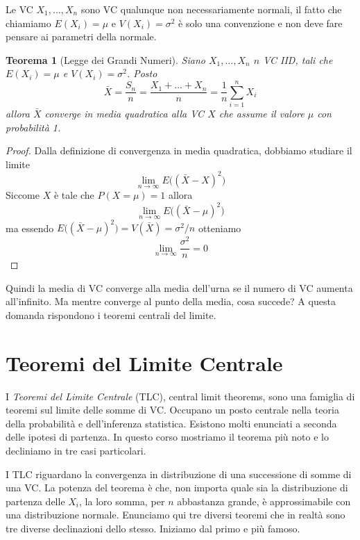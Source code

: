 \documentclass[
  11pt,
]{book}
\theoremstyle{mytheoremstyle}
\newtheorem{theorem}{Teorema}[section]
\theoremstyle{mydefstyle}
\newenvironment{att}
  {
\begin{tcolorbox}[enhanced,arc=0.1mm,boxrule=1pt,colback=white,colframe=ared,title=\bf\small \fontfamily{lmss}\selectfont \faExclamationTriangle \hspace{.5 cm} Attenzione,drop fuzzy shadow]
}{
\end{tcolorbox}
  }
\begin{document}
\begin{att}
Le VC \(X_1,...,X_n\) sono VC qualunque non necessariamente normali, il
fatto che chiamiamo \(E(X_i)=\mu\) e \(V(X_i)=\sigma^2\) è solo una
convenzione e non deve fare pensare ai parametri della normale.

\end{att}

\begin{theorem}[Legge dei Grandi Numeri]
Siano \(X_1,...,X_n\) \(n\) VC IID, tali che \(E(X_i)=\mu\) e
\(V(X_i)=\sigma^2\). Posto
\[\bar X= \frac{S_n}n =\frac{X_1+...+X_n}n=\frac 1n\sum_{i=1}^nX_i\]
allora \(\bar X\) converge in media quadratica alla VC \(X\) che assume il
valore \(\mu\) con probabilità 1.
\end{theorem}

\begin{proof}
Dalla definizione di convergenza in media quadratica, dobbiamo studiare
il limite \[\lim_{n\to\infty}E\big((\bar X-X)^2\big)\] Siccome \(X\) è
tale che \(P(X=\mu)=1\) allora
\[\lim_{n\to\infty}E\big((\bar X-\mu)^2\big)\] ma essendo
\(E\big((\bar X-\mu)^2\big)=V(\bar X)=\sigma^2/n\) otteniamo
\[\lim_{n\to\infty}\frac {\sigma^2}n=0\]
\end{proof}

Quindi la media di VC converge alla media dell'urna se il numero di VC
aumenta all'infinito. Ma mentre converge al punto della media, cosa
succede? A questa domanda rispondono i teoremi centrali del limite.

\section{Teoremi del Limite Centrale}\label{teoremi-del-limite-centrale}

I \emph{Teoremi del Limite Centrale} (TLC), central limit theorems, sono una
famiglia di teoremi sul limite delle somme di VC. Occupano un posto
centrale nella teoria della probabilità e dell'inferenza statistica.
Esistono molti enunciati a seconda delle ipotesi di partenza. In questo
corso mostriamo il teorema più noto e lo decliniamo in tre casi
particolari.

I TLC riguardano la convergenza in distribuzione di una successione di
somme di una VC. La potenza del teorema è che, non importa quale sia la
distribuzione di partenza delle \(X_i\), la loro somma, per \(n\) abbastanza
grande, è approssimabile con una distribuzione normale. Enunciamo qui
tre diversi teoremi che in realtà sono tre diverse declinazioni dello
stesso. Iniziamo dal primo e più famoso.
\end{document}
